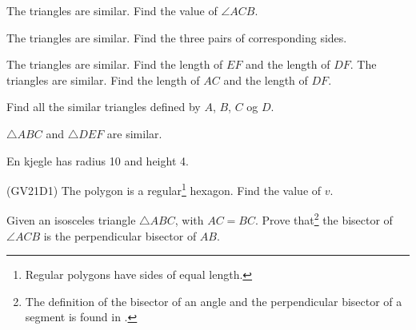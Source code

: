 




	
\opgt

The triangles are similar. Find the value of $ \angle ACB $. \vs
{}

The triangles are similar. Find the three pairs of corresponding sides.

The triangles are similar. Find the length of $ EF $ and the length of $ DF $.
\newpage
{}
The triangles are similar. Find the length of $ AC $ and the length of $ DF $.

Find all the similar triangles defined by $ A $, $ B $, $ C $ og $ D $.

$ \triangle ABC $ and $ \triangle DEF $ are similar.


\newpage
{}
En kjegle has radius 10 and height 4.

 \vs
{}

\newpage

(GV21D1) \os
The polygon is a regular\footnote{Regular polygons have sides of equal length.} hexagon. Find the value of $  v $.

Given an isosceles triangle $\triangle {ABC} $, with $ AC=BC $. Prove that\footnote{The definition of the bisector of an angle and the perpendicular bisector of a segment is found in \tmen.} the bisector of $ \angle ACB $ is the perpendicular bisector of $ AB $.

